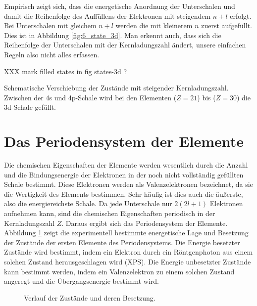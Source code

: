 Empirisch zeigt sich, dass die energetische Anordnung der Unterschalen und damit die Reihenfolge des Auffüllens der Elektronen mit steigendem $n+l$ erfolgt. Bei Unterschalen mit gleichem $n+l$ werden die mit kleinerem $n$ zuerst aufgefüllt. Dies ist in Abbildung  \ref{fig:6_state_3d}. Man erkennt auch, dass sich die Reihenfolge der Unterschalen mit der Kernladungszahl ändert, unsere einfachen Regeln also nicht alles erfassen.

XXX mark filled states in fig states-3d ?

\begin{marginfigure}
    \caption{Schematische Verschiebung der Zustände mit steigender Kernladungszahl. Zwischen der 4s und 4p-Schale wird bei den Elementen   ($Z=21$) bis  ($Z=30$) die 3d-Schale gefüllt.}
    \label{fig:6_state_3d}
\end{marginfigure}

\section{Das Periodensystem der Elemente}

Die chemischen Eigenschaften der Elemente werden wesentlich durch die Anzahl und die Bindungsenergie der Elektronen in der noch nicht vollständig gefüllten Schale bestimmt. Diese Elektronen werden als Valenzelektronen bezeichnet, da sie die Wertigkeit des Elements bestimmen. Sehr häufig ist dies auch die äußerste, also die energiereichste Schale. Da jede Unterschale nur $2 (2l +1)$ Elektronen aufnehmen kann, sind die chemischen Eigenschaften periodisch in der Kernladungszahl $Z$. Daraus ergibt sich das Periodensystem der Elemente. Abbildung \ref{fig:6:_PSE_states} zeigt die experimentell bestimmte energetische Lage und Besetzung der Zustände der ersten Elemente des Periodensystems. Die Energie besetzter Zustände wird bestimmt, indem ein Elektron durch ein Röntgenphoton aus einem solchen Zustand herausgeschlagen wird (XPS). Die Energie unbesetzter Zustände kann bestimmt werden, indem ein Valenzelektron zu einem solchen Zustand angeregt und die Übergangsenergie bestimmt wird.

\begin{figure}
    \caption{Verlauf der Zustände und deren Besetzung.}
    \label{fig:6:_PSE_states}
\end{figure}

